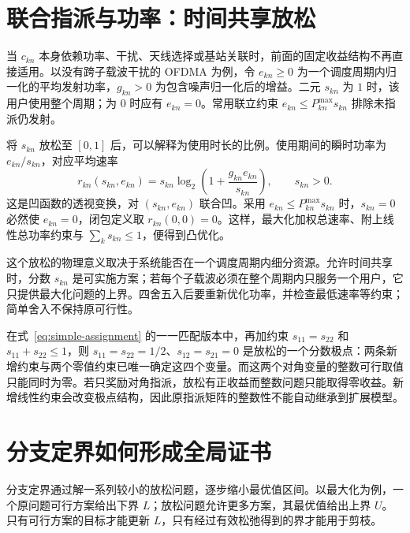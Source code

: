 \section{联合指派与功率：时间共享放松}

当 $c_{kn}$ 本身依赖功率、干扰、天线选择或基站关联时，前面的固定收益结构不再直接适用。以没有跨子载波干扰的 OFDMA 为例，令 $e_{kn}\geq0$ 为一个调度周期内归一化的平均发射功率，$g_{kn}>0$ 为包含噪声归一化后的增益。二元 $s_{kn}$ 为 $1$ 时，该用户使用整个周期；为 $0$ 时应有 $e_{kn}=0$。常用联立约束 $e_{kn}\leq P_{kn}^{\max}s_{kn}$ 排除未指派仍发射。

将 $s_{kn}$ 放松至 $[0,1]$ 后，可以解释为使用时长的比例。使用期间的瞬时功率为 $e_{kn}/s_{kn}$，对应平均速率
\begin{equation}
 r_{kn}(s_{kn},e_{kn})=
 s_{kn}\log_2\left(1+\frac{g_{kn}e_{kn}}{s_{kn}}\right),\qquad s_{kn}>0.
 \label{eq:ofdma-perspective}
\end{equation}
这是凹函数的透视变换，对 $(s_{kn},e_{kn})$ 联合凹\cite{boyd2004}。采用 $e_{kn}\leq P_{kn}^{\max}s_{kn}$ 时，$s_{kn}=0$ 必然使 $e_{kn}=0$，闭包定义取 $r_{kn}(0,0)=0$。这样，最大化加权总速率、附上线性总功率约束与 $\sum_ks_{kn}\leq1$，便得到凸优化。

这个放松的物理意义取决于系统能否在一个调度周期内细分资源。允许时间共享时，分数 $s_{kn}$ 是可实施方案；若每个子载波必须在整个周期内只服务一个用户，它只提供最大化问题的上界。四舍五入后要重新优化功率，并检查最低速率等约束；简单舍入不保持原可行性。

\begin{example}[线性附加约束可以破坏整数性]
在式~\eqref{eq:simple-assignment} 的一一匹配版本中，再加约束 $s_{11}=s_{22}$ 和 $s_{11}+s_{22}\leq1$，则 $s_{11}=s_{22}=1/2$、$s_{12}=s_{21}=0$ 是放松的一个分数极点：两条新增约束与两个零值约束已唯一确定这四个变量。而这两个对角变量的整数可行取值只能同时为零。若只奖励对角指派，放松有正收益而整数问题只能取得零收益。新增线性约束会改变极点结构，因此原指派矩阵的整数性不能自动继承到扩展模型。
\end{example}

\section{分支定界如何形成全局证书}

分支定界通过解一系列较小的放松问题，逐步缩小最优值区间。以最大化为例，一个原问题可行方案给出下界 $L$；放松问题允许更多方案，其最优值给出上界 $U$。只有可行方案的目标才能更新 $L$，只有经过有效松弛得到的界才能用于剪枝。

